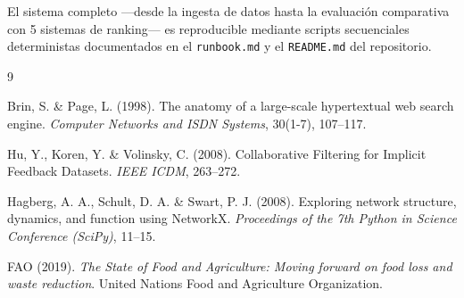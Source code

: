 \documentclass[12pt,a4paper]{article}
\newcommand{\code}[1]{\texttt{\small #1}}
\begin{document}
El sistema completo —desde la ingesta de datos hasta la evaluación comparativa con 5 sistemas de ranking— es reproducible mediante scripts secuenciales deterministas documentados en el \code{runbook.md} y el \code{README.md} del repositorio.

\begin{thebibliography}{9}

Brin, S. \& Page, L. (1998). The anatomy of a large-scale hypertextual web search engine. \textit{Computer Networks and ISDN Systems}, 30(1-7), 107--117.

Hu, Y., Koren, Y. \& Volinsky, C. (2008). Collaborative Filtering for Implicit Feedback Datasets. \textit{IEEE ICDM}, 263--272.

Hagberg, A. A., Schult, D. A. \& Swart, P. J. (2008). Exploring network structure, dynamics, and function using NetworkX. \textit{Proceedings of the 7th Python in Science Conference (SciPy)}, 11--15.

FAO (2019). \textit{The State of Food and Agriculture: Moving forward on food loss and waste reduction}. United Nations Food and Agriculture Organization.

\end{thebibliography}
\end{document}
